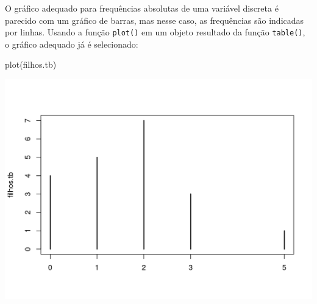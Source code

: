 \documentclass[
  10pt,
  a4paper]{book}
\newenvironment{Shaded}{\begin{snugshade}}{\end{snugshade}}
\newcommand{\DecValTok}[1]{\textcolor[rgb]{0.00,0.00,0.81}{#1}}
\newcommand{\DocumentationTok}[1]{\textcolor[rgb]{0.56,0.35,0.01}{\textbf{\textit{#1}}}}
\newcommand{\FloatTok}[1]{\textcolor[rgb]{0.00,0.00,0.81}{#1}}
\newcommand{\FunctionTok}[1]{\textcolor[rgb]{0.00,0.00,0.00}{#1}}
\newcommand{\NormalTok}[1]{#1}
\newcommand{\OtherTok}[1]{\textcolor[rgb]{0.56,0.35,0.01}{#1}}
\newcommand{\SpecialCharTok}[1]{\textcolor[rgb]{0.00,0.00,0.00}{#1}}
\begin{document}
\begin{Shaded}
\end{Shaded}

O gráfico adequado para frequências absolutas de uma variável discreta é
parecido com um gráfico de barras, mas nesse caso, as frequências são
indicadas por linhas. Usando a função \texttt{plot()} em um objeto resultado da
função \texttt{table()}, o gráfico adequado já é selecionado:

\begin{Shaded}
\begin{Highlighting}[]
\FunctionTok{plot}\NormalTok{(filhos.tb)}
\end{Highlighting}
\end{Shaded}

\begin{center}\includegraphics{figures/unnamed-chunk-300-1} \end{center}
\end{document}
